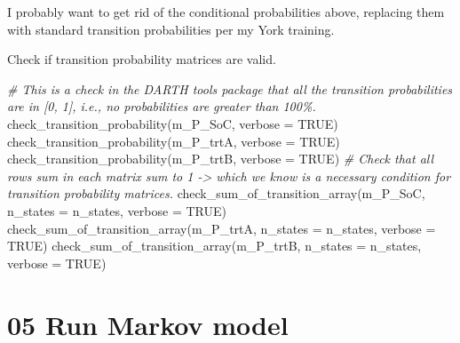 \documentclass[
]{article}
\newenvironment{Shaded}{\begin{snugshade}}{\end{snugshade}}
\newcommand{\AttributeTok}[1]{\textcolor[rgb]{0.77,0.63,0.00}{#1}}
\newcommand{\CommentTok}[1]{\textcolor[rgb]{0.56,0.35,0.01}{\textit{#1}}}
\newcommand{\ConstantTok}[1]{\textcolor[rgb]{0.00,0.00,0.00}{#1}}
\newcommand{\FunctionTok}[1]{\textcolor[rgb]{0.00,0.00,0.00}{#1}}
\newcommand{\NormalTok}[1]{#1}
\begin{document}
I probably want to get rid of the conditional probabilities above,
replacing them with standard transition probabilities per my York
training.

Check if transition probability matrices are valid.

\begin{Shaded}
\begin{Highlighting}[]
\CommentTok{\# This is a check in the DARTH tools package that all the transition probabilities are in [0, 1], i.e., no probabilities are greater than 100\%.}
\FunctionTok{check\_transition\_probability}\NormalTok{(m\_P\_SoC,  }\AttributeTok{verbose =} \ConstantTok{TRUE}\NormalTok{)}
\FunctionTok{check\_transition\_probability}\NormalTok{(m\_P\_trtA, }\AttributeTok{verbose =} \ConstantTok{TRUE}\NormalTok{)}
\FunctionTok{check\_transition\_probability}\NormalTok{(m\_P\_trtB, }\AttributeTok{verbose =} \ConstantTok{TRUE}\NormalTok{)}
\CommentTok{\# Check that all rows sum in each matrix sum to 1 {-}\textgreater{} which we know is a necessary condition for transition probability matrices.}
\FunctionTok{check\_sum\_of\_transition\_array}\NormalTok{(m\_P\_SoC,  }\AttributeTok{n\_states =}\NormalTok{ n\_states, }\AttributeTok{verbose =} \ConstantTok{TRUE}\NormalTok{)}
\FunctionTok{check\_sum\_of\_transition\_array}\NormalTok{(m\_P\_trtA, }\AttributeTok{n\_states =}\NormalTok{ n\_states, }\AttributeTok{verbose =} \ConstantTok{TRUE}\NormalTok{)}
\FunctionTok{check\_sum\_of\_transition\_array}\NormalTok{(m\_P\_trtB, }\AttributeTok{n\_states =}\NormalTok{ n\_states, }\AttributeTok{verbose =} \ConstantTok{TRUE}\NormalTok{)}
\end{Highlighting}
\end{Shaded}

\hypertarget{run-markov-model}{%
\section{05 Run Markov model}\label{run-markov-model}}
\end{document}

